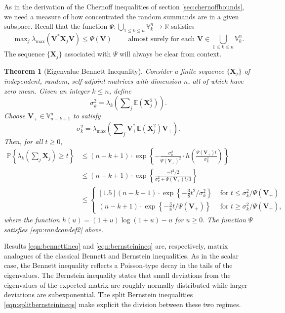 \documentclass[11pt,letterpaper,twoside,reqno,nosumlimits]{amsart}
\renewcommand{\star}{*}
\newcommand{\mat}[1]{\ensuremath{\bm{#1}}} %
\newcommand{\E}{\ensuremath{\mathbb{E}}}
\newcommand{\Prob}[1]{\ensuremath{\mathbb{P}\left\{#1\right\}}}
\newcommand{\R}{\ensuremath{\mathbb{R}}}
\newcommand{\randcon}{\ensuremath{\Psi}}
\newcommand{\lambdamax}[1]{\ensuremath{\lambda_{\mathrm{max}}\left(#1\right)}}
\newcommand{\Isom}[2]{\ensuremath{\mathbb{V}_{#1}^{#2}}}
\newtheorem{thm}{Theorem}
\theoremstyle{remark}
\numberwithin{equation}{section}
\numberwithin{thm}{section}
\numberwithin{prop}{section}
\numberwithin{defn}{section}
\numberwithin{remark}{section}
\begin{document}
As in the derivation of the Chernoff inequalities of section \ref{sec:chernoffbounds}, we need a measure of how concentrated the random summands are in a given subspace. Recall that the function $\randcon : \bigcup_{1 \leq k \leq n} \Isom{k}{n} \rightarrow \R$ satisfies
\begin{equation}
	\max\nolimits_j \lambdamax{\mat{V}^\star \mat{X}_j \mat{V}} \leq \randcon(\mat{V}) \qquad \text{ almost surely for each } \mat{V} \in \bigcup_{1 \leq k \leq n} \Isom{k}{n}. 
\label{eqn:randcondef2}
\end{equation}
The sequence $\{\mat{X}_j\}$ associated with $\randcon$ will always be clear from context.

\begin{thm}[Eigenvalue Bennett Inequality]
\label{thm:bennett}
Consider a finite sequence $\{\mat{X}_j\}$ of independent, random, self-adjoint matrices with dimension $n$, all of which have zero mean. Given an integer $k \leq n$, define
\[
 \sigma_k^2 = \lambda_k\left(\sum\nolimits_j \E(\mat{X}_j^2) \right). 
\]
Choose $\mat{V}_{+}\in \Isom{n-k+1}{n}$ to satisfy
\[
 \sigma_k^2 = \lambdamax{\sum\nolimits_j \mat{V}_{+}^\star\E(\mat{X}_j^2)\mat{V}_{+}}.
\]
Then, for all $t \geq 0,$
\begin{align}
\Prob{\lambda_k\left( \sum\nolimits_j \mat{X}_j \right) \geq t } & \leq (n-k+1) \cdot \exp\left\{-\frac{\sigma_k^2}{\randcon(\mat{V}_{+})^2} \cdot h\left(\frac{\randcon(\mat{V}_{+})t}{\sigma_k^2}\right) \right\} \tag{i} \label{eqn:bennettineq} \\
 & \leq (n-k+1) \cdot \exp\left\{ \frac{-t^2/2}{\sigma_k^2 + \randcon(\mat{V}_+)t/3} \right\} \tag{ii} \label{eqn:bernsteinineq} \\
 & \leq \begin{cases}[1.5]
        (n-k+1) \cdot \exp\left\{-\tfrac{3}{8}t^2/\sigma_k^2\right\}  & \text{ for } t \leq \sigma_k^2/\randcon(\mat{V}_+) \\
        (n-k+1) \cdot \exp\left\{-\tfrac{3}{8} t/\randcon(\mat{V}_+)\right\} & \text{ for } t \geq \sigma_k^2/\randcon(\mat{V}_+),  
        \end{cases} \tag{iii}  \label{eqn:splitbernsteinineqs} 
\end{align}
where the function $h(u) = (1+u)\log(1+u) - u$ for $u \geq 0.$ The function $\randcon$ satisfies \eqref{eqn:randcondef2} above.
\end{thm}

Results \eqref{eqn:bennettineq} and \eqref{eqn:bernsteinineq} are, respectively, matrix analogues of the classical Bennett and Bernstein inequalities. As in the scalar case, the Bennett inequality reflects a Poisson-type decay in the tails of the eigenvalues. The Bernstein inequality states that small deviations from the eigenvalues of the expected matrix are roughly normally distributed while larger deviations are subexponential. The split Bernstein inequalities \eqref{eqn:splitbernsteinineqs} make explicit the division between these two regimes.
\end{document}
